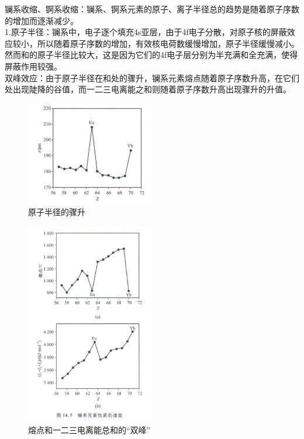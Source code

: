 \documentclass[a4paper,UTF8]{article}
\begin{document}
镧系收缩、锕系收缩：镧系、锕系元素的原子、离子半径总的趋势是随着原子序数的增加而逐渐减少。\\

1.原子半径：镧系中，电子逐个填充4s亚层，由于4f电子分散，对原子核的屏蔽效应较小，所以随着原子序数的增加，有效核电荷数缓慢增加，原子半径缓慢减小。然而和的原子半径比较大，这是因为它们的4f电子层分别为半充满和全充满，使得屏蔽作用较强。\\

双峰效应：由于原子半径在和处的骤升，镧系元素熔点随着原子序数升高，在它们处出现陡降的谷值，而一二三电离能之和则随着原子序数升高出现骤升的升值。\\

\begin{figure}[htpb]
	\centering
	\includegraphics[width=0.5\textwidth]{figure//双峰效应1.png}
	\caption{原子半径的骤升}
	\label{fig:}
\end{figure}

\begin{figure}[htpb]
	\centering
	\includegraphics[width=0.5\textwidth]{figure//双峰效应2.png}
	\caption{熔点和一二三电离能总和的“双峰”}
	\label{fig:}
\end{figure}
\end{document}
